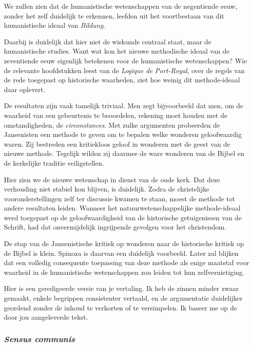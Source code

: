 We zullen zien dat de humanistische wetenschappen van de negentiende eeuw, zonder het zelf duidelijk te erkennen, leefden uit het voortbestaan van dit humanistische ideaal van \textit{Bildung}.

Daarbij is duidelijk dat hier niet de wiskunde centraal staat, maar de humanistische studies. Want wat kon het nieuwe methodische ideaal van de zeventiende eeuw eigenlijk betekenen voor de humanistische wetenschappen? Wie de relevante hoofdstukken leest van de \textit{Logique de Port-Royal}, over de regels van de rede toegepast op historische waarheden, ziet hoe weinig dit methode-ideaal daar oplevert.

De resultaten zijn vaak tamelijk triviaal. Men zegt bijvoorbeeld dat men, om de waarheid van een gebeurtenis te beoordelen, rekening moet houden met de omstandigheden, de \textit{circonstances}. Met zulke argumenten probeerden de Jansenisten een methode te geven om te bepalen welke wonderen geloofwaardig waren. Zij bestreden een kritiekloos geloof in wonderen met de geest van de nieuwe methode. Tegelijk wilden zij daarmee de ware wonderen van de Bijbel en de kerkelijke traditie veiligstellen.

Hier zien we de nieuwe wetenschap in dienst van de oude kerk. Dat deze verhouding niet stabiel kon blijven, is duidelijk. Zodra de christelijke vooronderstellingen zelf ter discussie kwamen te staan, moest de methode tot andere resultaten leiden. Wanneer het natuurwetenschappelijke methode-ideaal werd toegepast op de geloofwaardigheid van de historische getuigenissen van de Schrift, had dat onvermijdelijk ingrijpende gevolgen voor het christendom.

De stap van de Jansenistische kritiek op wonderen naar de historische kritiek op de Bijbel is klein. Spinoza is daarvan een duidelijk voorbeeld. Later zal blijken dat een volledig consequente toepassing van deze methode als enige maatstaf voor waarheid in de humanistische wetenschappen zou leiden tot hun zelfvernietiging.

Hier is een geredigeerde versie van je vertaling. Ik heb de zinnen minder zwaar gemaakt, enkele begrippen consistenter vertaald, en de argumentatie duidelijker geordend zonder de inhoud te verkorten of te versimpelen. Ik baseer me op de door jou aangeleverde tekst. 

\subsubsection{\textit{Sensus communis}}

